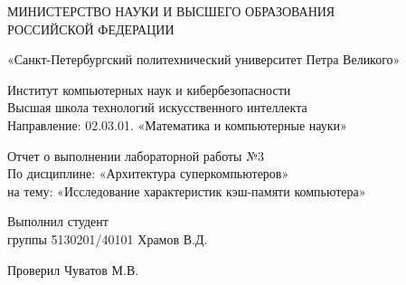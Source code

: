     \begin{titlepage}
        \thispagestyle{empty}
        
        \begin{center}
        
            { \large МИНИСТЕРСТВО НАУКИ И ВЫСШЕГО ОБРАЗОВАНИЯ \\ 
                РОССИЙСКОЙ ФЕДЕРАЦИИ }
             
            { «Санкт-Петербургский политехнический университет Петра Великого» }
            
            { Институт компьютерных наук и кибербезопасности \\ 
                Высшая школа технологий искусственного интеллекта \\
                Направление: 02.03.01. «Математика и компьютерные науки» \\ }        
              
              \vspace{3cm}
            { \large Отчет о выполнении лабораторной работы №3 \\ 
              По дисциплине: «Архитектура суперкомпьютеров» \\ 
              на тему: «Исследование характеристик кэш-памяти компьютера»
            }
    
        \end{center}
    
        \vspace{3cm}

        \begin{center}
            \noindent
            \begin{minipage}[t]{\textwidth}
                \raggedright Выполнил студент \\ группы 5130201/40101\hfill 
                \underline{\hspace{3cm}} Храмов В.Д.
            \end{minipage}
            
            \vspace{1cm}
            
            \noindent
            \begin{minipage}[t]{\textwidth}
                \raggedright Проверил  \hfill 
                \underline{\hspace{3cm}} Чуватов М.В.
            \end{minipage}
        \end{center}
        

\end{titlepage}

